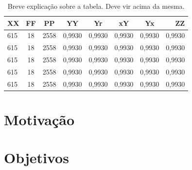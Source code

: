 \begin{table}[htpb]
   \centering
   \caption{Breve explicação sobre a tabela. Deve vir acima da mesma.}\label{tab:tabela}
   \begin{tabular}{|l|c|c|c|c|c|c|r|}
        \hline
        \small{XX} & \small{FF} & \small{PP} & \small{YY} & \small{Yr} & \small{xY} & \small{Yx} & \small{ZZ} \\ \hline
               615 &    18      &     2558   &    0,9930  &    0,9930  &    0,9930  &    0,9930  &    0,9930  \\ \hline
               615 &    18      &     2558   &    0,9930  &    0,9930  &    0,9930  &    0,9930  &    0,9930  \\ \hline
               615 &    18      &     2558   &    0,9930  &    0,9930  &    0,9930  &    0,9930  &    0,9930  \\ \hline
               615 &    18      &     2558   &    0,9930  &    0,9930  &    0,9930  &    0,9930  &    0,9930  \\ \hline
               615 &    18      &     2558   &    0,9930  &    0,9930  &    0,9930  &    0,9930  &    0,9930  \\ \hline
   \end{tabular}
\end{table}

\section*{Motivação}\label{sec:motivacao}

\lipsum[35]

\section*{Objetivos}\label{sec:objetivos}

\lipsum[36]
